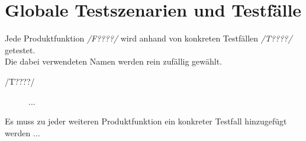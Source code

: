 \section{Globale Testszenarien und Testfälle}


Jede Produktfunktion \textit{/F????/} wird anhand von konkreten Testfällen \textit{/T????/} getestet.\\
Die dabei verwendeten Namen werden rein zufällig gewählt.

\begin{description}
  \item[/T????/]
    ...
\end{description}

\textcolor{warning}{Es muss zu jeder weiteren Produktfunktion ein konkreter Testfall hinzugefügt werden ...}
